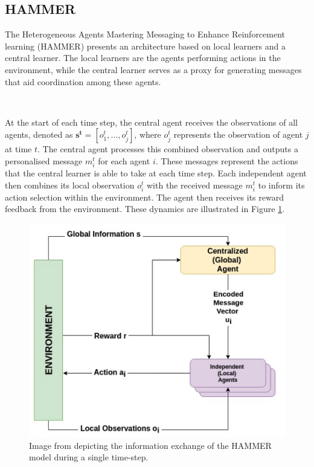 \documentclass{article}
\begin{document}
\subsection{HAMMER}

The Heterogeneous Agents Mastering Messaging to Enhance Reinforcement learning (HAMMER) \citep{gupta2022HAMMER} presents an architecture based on local learners and a central learner. The local learners are the agents performing actions in the environment, while the central learner serves as a proxy for generating messages that aid coordination among these agents. 

\

At the start of each time step, the central agent receives the observations of all agents, denoted as $\mathbf{s^t} = [o_1^t, \hdots, o_j^t]$, where $o_j^t$ represents the observation of agent $j$ at time $t$. The central agent processes this combined observation and outputs a personalised message $m_i^t$ for each agent $i$. These messages represent the actions that the central learner is able to take at each time step. Each independent agent then combines its local observation $o_i^t$ with the received message $m_i^t$ to inform its action selection within the environment. The agent then receives its reward feedback from the environment. These dynamics are illustrated in Figure \ref{fig:hammer}.

\begin{figure}
	\centering
	\includegraphics[scale=0.5]{images/hammer}
	\caption{Image from \citet{gupta2022HAMMER} depicting the information exchange of the HAMMER model during a single time-step.}
	\label{fig:hammer}
\end{figure}
\end{document}
